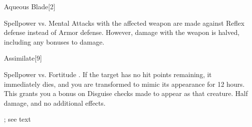 \begin{spellsection}{Aqueous Blade}[2]
    \begin{spellheader}
    \end{spellheader}
    \begin{spellcontent}
        \begin{spelltargetinginfo}
        \end{spelltargetinginfo}
        \begin{spelleffects}
            \begin{spellattack}{Spellpower vs. Mental}
                \spellsuccess Attacks with the affected weapon are made against Reflex defense instead of Armor defense. However, damage with the weapon is halved, including any bonuses to damage.
            \end{spellattack}
            \spelldur \durshort
        \end{spelleffects}
    \end{spellcontent}
    \begin{spellfooter}
        \miscastrandom
    \end{spellfooter}
\end{spellsection}

\begin{spellsection}{Assimilate}[9]
    \begin{spellheader}
    \end{spellheader}
    \begin{spellcontent}
        \begin{spelltargetinginfo}
        \end{spelltargetinginfo}
        \begin{spelleffects}
            \begin{spellattack}{Spellpower vs. Fortitude}
                \spellsuccess {}. If the target has no hit points remaining, it immediately dies, and you are transformed to mimic its appearance for 12 hours. This grants you a  bonus on Disguise checks made to appear as that creature.
                \spellfailure Half damage, and no additional effects.
            \end{spellattack}
            \spelldur \durext; see text
        \end{spelleffects}
    \end{spellcontent}
    \begin{spellfooter}
        \miscastrandom
    \end{spellfooter}
\end{spellsection}

